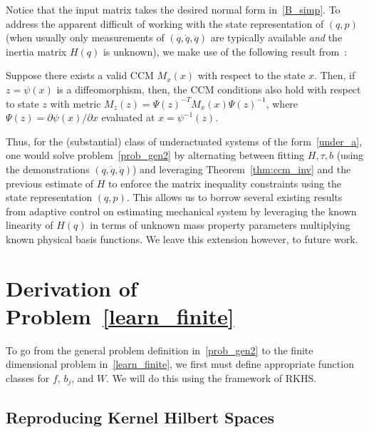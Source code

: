 Notice that the input matrix takes the desired normal form in~\eqref{B_simp}. To address the apparent difficult of working with the state representation of $(q,p)$ (when usually only measurements of $(q,\dot{q},\ddot{q})$ are typically available \emph{and} the inertia matrix $H(q)$ is unknown), we make use of the following result from~\cite{ManchesterSlotine2017}:

\begin{theorem}\label{thm:ccm_inv}
Suppose there exists a valid CCM $M_x(x)$ with respect to the state $x$. Then, if $z = \psi(x)$ is a diffeomorphism, then, the CCM conditions also hold with respect to state $z$ with metric $M_z(z) = \Psi(z)^{-T}M_x(x)\Psi(z)^{-1}$, where $\Psi(z) = \partial \psi(x)/\partial x$ evaluated at $x = \psi^{-1}(z)$.
\end{theorem}

Thus, for the (substantial) class of underactuated systems of the form~\eqref{under_a}, one would solve problem~\eqref{prob_gen2} by alternating between fitting $H, \tau, b$ (using the demonstrations $(q,\dot{q},\ddot{q})$) and leveraging Theorem~\ref{thm:ccm_inv} and the previous estimate of $H$ to enforce the matrix inequality constraints using the state representation $(q,p)$. This allows us to borrow several existing results from adaptive control on estimating mechanical system by leveraging the known linearity of $H(q)$ in terms of unknown mass property parameters multiplying known physical basis functions. We leave this extension however, to future work.


\section{Derivation of Problem~\eqref{learn_finite}}\label{sec:deriv}

To go from the general problem definition in~\eqref{prob_gen2} to the finite dimensional problem in~\eqref{learn_finite}, we first must define appropriate function classes for $f$, $b_j$, and $W$. We will do this using the framework of RKHS.

\subsection{Reproducing Kernel Hilbert Spaces}

